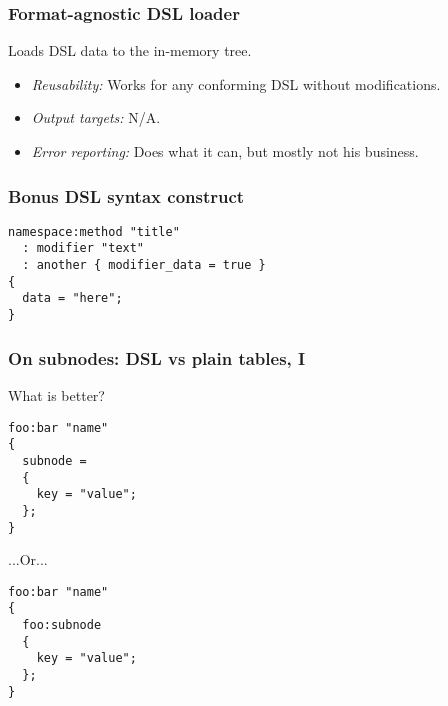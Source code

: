 \documentclass[handout]{beamer}
\begin{document}

\begin{frame}

\frametitle{Format-agnostic DSL loader}

Loads DSL data to the in-memory tree.

\begin{itemize}
\item \emph{Reusability:} Works for any conforming DSL without modifications.
\item \emph{Output targets:} N/A.
\item \emph{Error reporting:} Does what it can, but mostly not his business.
\end{itemize}

\end{frame}


\begin{frame}[fragile]

\frametitle{Bonus DSL syntax construct}

\begin{verbatim}
namespace:method "title"
  : modifier "text"
  : another { modifier_data = true }
{
  data = "here";
}
\end{verbatim}

\end{frame}


\begin{frame}[fragile]

\frametitle{On subnodes: DSL vs plain tables, I}

What is better?

\begin{verbatim}
foo:bar "name"
{
  subnode =
  {
    key = "value";
  };
}
\end{verbatim}

...Or...

\begin{verbatim}
foo:bar "name"
{
  foo:subnode
  {
    key = "value";
  };
}
\end{verbatim}

\end{frame}

\end{document}
